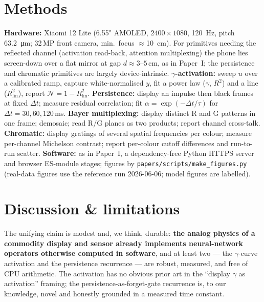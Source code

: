 \documentclass[11pt]{article}
\begin{document}
\section{Methods}
\label{sec:methods}
\textbf{Hardware:} Xiaomi 12 Lite (6.55" AMOLED, $2400\times1080$, \SI{120}{\hertz}, pitch
\SI{63.2}{\micro\meter}; 32\,MP front camera, min.\ focus $\approx$\SI{10}{\centi\meter}). For
primitives needing the reflected channel (activation read-back, attention multiplexing) the
phone lies screen-down over a flat mirror at gap $d\approx 3$--$5$\,cm, as in Paper~I; the
persistence and chromatic primitives are largely device-intrinsic.
\textbf{$\gamma$-activation:} sweep $u$ over a calibrated ramp, capture white-normalised $y$,
fit a power law ($\gamma$, $R^2$) and a line ($R^2_\text{lin}$), report
$\mathcal{N}=1-R^2_\text{lin}$. \textbf{Persistence:} display an impulse then black frames at
fixed $\Delta t$; measure residual correlation; fit $\alpha=\exp(-\Delta t/\tau)$ for
$\Delta t = 30, 60, 120$\,ms. \textbf{Bayer multiplexing:} display distinct R and G patterns in
one frame; demosaic; read R/G planes as two products; report channel cross-talk.
\textbf{Chromatic:} display gratings of several spatial frequencies per colour; measure
per-channel Michelson contrast; report per-colour cutoff differences and run-to-run scatter.
\textbf{Software:} as in Paper~I, a dependency-free Python HTTPS server and browser ES-module
stages; figures by \texttt{papers/scripts/make\_figures.py} (real-data figures use the
reference run 2026-06-06; model figures are labelled).

\section{Discussion \& limitations}
\label{sec:disc}
The unifying claim is modest and, we think, durable: \textbf{the analog physics of a commodity
display and sensor already implements neural-network operators otherwise computed in software},
and at least two --- the $\gamma$-curve activation and the persistence recurrence --- are
robust, measured, and free of CPU arithmetic. The activation has no obvious prior art in the
``display $\gamma$ as activation'' framing; the persistence-as-forget-gate recurrence is, to
our knowledge, novel and honestly grounded in a measured time constant.
\end{document}
